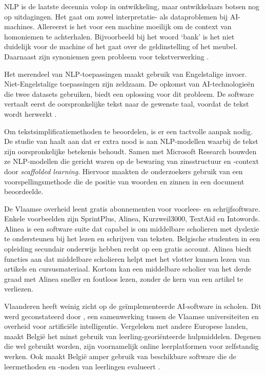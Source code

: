 
NLP is de laatste decennia volop in ontwikkeling, maar ontwikkelaars botsen nog op uitdagingen. Het gaat om zowel interpretatie- als dataproblemen bij AI-machines. Allereerst is het voor een machine moeilijk om de context van homoniemen te achterhalen. Bijvoorbeeld bij het woord ‘bank’ is het niet duidelijk voor de machine of het gaat over de geldinstelling of het meubel. Daarnaast zijn synoniemen geen probleem voor tekstverwerking \autocite{Roldos2020}.

Het merendeel van NLP-toepassingen maakt gebruik van Engelstalige invoer. Niet-Engelstalige toepassingen zijn zeldzaam. De opkomst van AI-technologieën die twee datasets gebruiken, biedt een oplossing voor dit probleem. De software vertaalt eerst de oorspronkelijke tekst naar de gewenste taal, voordat de tekst wordt herwerkt \autocite{Sciforce2020}.

Om tekstsimplificatiemethoden te beoordelen, is er een tactvolle aanpak nodig. De studie van \textcite{Swayamdipta2019} haalt aan dat er extra nood is aan NLP-modellen waarbij de tekst zijn oorspronkelijke betekenis behoudt. Samen met Microsoft Research bouwden ze NLP-modellen die gericht waren op de bewaring van zinsstructuur en -context door \emph{scaffolded learning}. Hiervoor maakten de onderzoekers gebruik van een voorspellingsmethode die de positie van woorden en zinnen in een document beoordeelde.



De Vlaamse overheid leent gratis abonnementen voor voorlees- en schrijfsoftware. Enkele voorbeelden zijn SprintPlus, Alinea, Kurzweil3000, TextAid en Intowords. Alinea is een software suite dat capabel is om middelbare scholieren met dyslexie te ondersteunen bij het lezen en schrijven van teksten. Belgische studenten in een opleiding secundair onderwijs hebben recht op een gratis account. Alinea biedt functies aan dat middelbare scholieren helpt met het vlotter kunnen lezen van artikels en cursusmateriaal. Kortom kan een middelbare scholier van het derde graad met Alinea sneller en foutloos lezen, zonder de kern van een artikel te verliezen.

Vlaanderen heeft weinig zicht op de geïmplementeerde AI-software in scholen. Dit werd geconstateerd door \autocite{Martens2021}, een samenwerking tussen de Vlaamse universiteiten en overheid voor artificiële intelligentie. Vergeleken met andere Europese landen, maakt België het minst gebruik van leerling-georiënteerde hulpmiddelen. Degenen die wel gebruikt worden, zijn voornamelijk online leerplatformen voor zelfstandig werken. Ook maakt België amper gebruik van beschikbare software die de leermethoden en -noden van leerlingen evalueert \autocite{Martens2021a}. 

